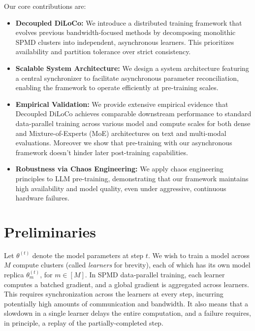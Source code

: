 \documentclass[11pt, a4paper, twocolumn, copyright, google]{google}
\begin{document}
Our core contributions are:
\begin{itemize}
    \item \textbf{Decoupled DiLoCo:} We introduce a distributed training framework that evolves previous bandwidth-focused methods by decomposing monolithic SPMD clusters into independent, asynchronous learners. This prioritizes availability and partition tolerance over strict consistency.
    \item \textbf{Scalable System Architecture:} We design a system architecture featuring a central synchronizer to facilitate asynchronous parameter reconciliation, enabling the framework to operate efficiently at pre-training scales.
    \item \textbf{Empirical Validation:} We provide extensive empirical evidence that Decoupled DiLoCo achieves comparable downstream performance to standard data-parallel training across various model and compute scales for both dense and Mixture-of-Experts (MoE) architectures on text and multi-modal evaluations. Moreover we show that pre-training with our asynchronous framework doesn't hinder later post-training capabilities.
    \item \textbf{Robustness via Chaos Engineering:} We apply chaos engineering~\citep{basiri2016chaos} principles to LLM pre-training, demonstrating that our framework maintains high availability and model quality, even under aggressive, continuous hardware failures.
\end{itemize}

\section{Preliminaries}\label{sec:preliminaries}

Let $\theta^{(t)}$ denote the model parameters at step $t$. We wish to train a model across $M$ compute clusters (called \emph{learners} for brevity), each of which has its own model replica $\theta_m^{(t)}$, for $m \in [M]$. In SPMD data-parallel training, each learner computes a batched gradient, and a global gradient is aggregated across learners. This requires synchronization across the learners at every step, incurring potentially high amounts of communication and bandwidth. It also means that a slowdown in a single learner delays the entire computation, and a failure requires, in principle, a replay of the partially-completed step.
\end{document}
